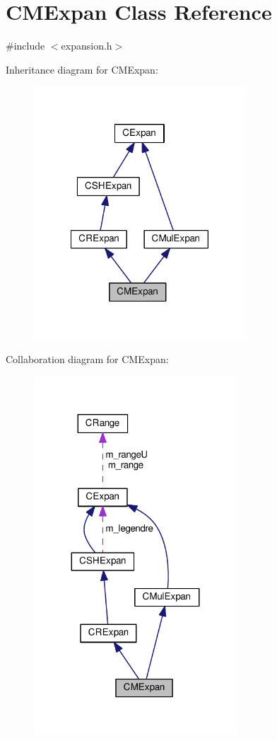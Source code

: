\hypertarget{classCMExpan}{\section{C\-M\-Expan Class Reference}
\label{classCMExpan}
}


{\ttfamily \#include $<$expansion.\-h$>$}



Inheritance diagram for C\-M\-Expan\-:\nopagebreak
\begin{figure}[H]
\begin{center}
\leavevmode
\includegraphics[width=225pt]{classCMExpan__inherit__graph}
\end{center}
\end{figure}


Collaboration diagram for C\-M\-Expan\-:\nopagebreak
\begin{figure}[H]
\begin{center}
\leavevmode
\includegraphics[width=215pt]{classCMExpan__coll__graph}
\end{center}
\end{figure}
